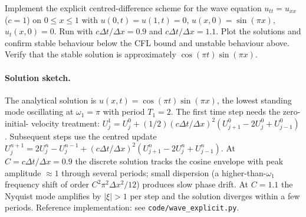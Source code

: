 \begin{exercise}
Implement the explicit centred-difference scheme for the wave
equation $u_{tt} = u_{xx}$ ($c = 1$) on $0 \leq x \leq 1$ with
$u(0, t) = u(1, t) = 0$, $u(x, 0) = \sin(\pi x)$, $u_{t}(x, 0) =
0$. Run with $c \Delta t/\Delta x = 0.9$ and $c \Delta t/\Delta x
= 1.1$. Plot the solutions and confirm stable behaviour below
the CFL bound and unstable behaviour above. Verify that the
stable solution is approximately $\cos(\pi t)\sin(\pi x)$.

\paragraph{Solution sketch.}
The analytical solution is $u(x, t) = \cos(\pi t)\sin(\pi x)$,
the lowest standing mode oscillating at $\omega_{1} = \pi$ with
period $T_{1} = 2$. The first time step needs the zero-initial-
velocity treatment: $U_{j}^{1} = U_{j}^{0} + (1/2)(c\Delta t/
\Delta x)^{2}(U_{j+1}^{0} - 2 U_{j}^{0} + U_{j-1}^{0})$. Subsequent
steps use the centred update $U_{j}^{n+1} = 2 U_{j}^{n} -
U_{j}^{n-1} + (c\Delta t/\Delta x)^{2}(U_{j+1}^{n} - 2 U_{j}^{n} +
U_{j-1}^{n})$. At $C = c\Delta t/\Delta x = 0.9$ the discrete
solution tracks the cosine envelope with peak amplitude $\approx 1$
through several periods; small dispersion (a higher-than-$\omega_{1}$
frequency shift of order $C^{2} \pi^{2} \Delta x^{2}/12$)
produces slow phase drift. At $C = 1.1$ the Nyquist mode
amplifies by $|\xi| > 1$ per step and the solution diverges
within a few periods. Reference implementation: see
\texttt{code/wave\_explicit.py}.
\end{exercise}

